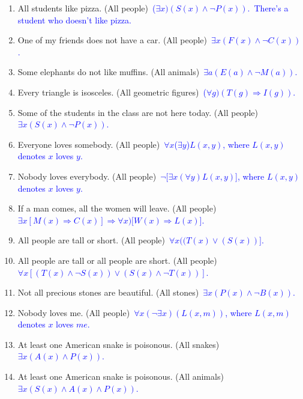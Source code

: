 \documentclass[13.5pt]{article}
\begin{document}
\begin{enumerate}
\begin{enumerate}
\item{All students like pizza. (All people)}\
\textcolor{blue} {(\(\exists x)(S(x)\wedge \neg P(x))\).}\
\textcolor{blue} {There's a student who doesn't like pizza.}\

\item{One of my friends does not have a car. (All people)}\ 
\textcolor{blue} {\(\exists x(F(x)\wedge \neg C(x))\).}\
\item{Some elephants do not like muffins. (All animals)}\
\textcolor{blue} {\(\exists a(E(a)\wedge \neg M(a))\).}\
\item{Every triangle is isosceles. (All geometric figures)}\
\textcolor{blue} {(\(\forall g)(T(g)\Rightarrow I(g))\).}\
\item{Some of the students in the class are not here today. (All people)}\
\textcolor{blue} {\(\exists x(S(x)\wedge \neg P(x))\).}\
\item{Everyone loves somebody. (All people)}\
\textcolor{blue} {\(\forall x\)(\(\exists y\))\(L(x,y)\), where \(L(x,y)\) denotes \(x\) loves \(y\). }
\item{Nobody loves everybody. (All people)}\
\textcolor{blue} {\( \neg [\exists x(\forall y)L(x,y)\)], where \(L(x,y)\) denotes \(x\) loves \(y\). }
\item{If a man comes, all the women will leave. (All people)}\
\textcolor{blue} {\( \exists x[M(x) \Rightarrow C(x)]\Rightarrow \forall x)[W(x) \Rightarrow L(x)\)].}
\item{All people are tall or short. (All people)}\
\textcolor{blue} {\( \forall x((T(x)\vee (S(x))]\).}\
\item{All people are tall or all people are short. (All people)}\
\textcolor{blue} {\( \forall x[(T(x)\wedge \neg S(x))\vee (S(x) \wedge \neg T(x))]\).}\
\item{Not all precious stones are beautiful. (All stones)}\
\textcolor{blue} {\(\exists x(P(x)\wedge \neg B(x))\).}\
\item{Nobody loves me. (All people)}\
\textcolor{blue} {\(\forall x(\neg \exists x)(L(x,m))\), where \(L(x,m)\) denotes \(x\) loves \(me\). }
\item{At least one American snake is poisonous. (All snakes)}\
\textcolor{blue} {\(\exists x(A(x) \wedge P(x))\).}\
\item{At least one American snake is poisonous. (All animals)}\
\textcolor{blue} {\(\exists x(S(x)\wedge A(x) \wedge P(x))\).}\

\end{enumerate}


\end{enumerate}
\end{document}
